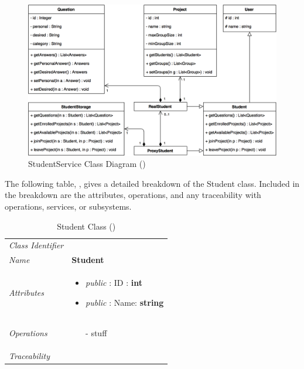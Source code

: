 \documentclass[12pt,letterpaper]{article}
\begin{document}
\begin{figure}[H]
	\centering{}
	\includegraphics[scale=0.33]{imgs/d3/interfaces/student.png}
	\caption{StudentService Class Diagram ()}
\end{figure}

The following table, , gives a detailed breakdown of the Student class. Included in the breakdown are the attributes, operations, and any traceability with operations, services, or subsystems.

\begin{table}[H]
    \caption{Student Class ()} 
	\begin{tabu} to 
		\toprule
		Class Identifier &  \\
		Name & {\bf Student} \\
		Attributes & 
		\begin{minipage}[t]{\linewidth}
		    \begin{itemize}
		        \item \textit{public} : ID : {\bf int}
		        \item \textit{public} : Name: {\bf string}
			\end{itemize}
	    \end{minipage} \\

		Operations &
		\begin{minipage}[t]{\linewidth}
			\begin{enumerate}
			    \item[-] stuff
	        \end{enumerate}
	    \end{minipage} \\
	    	Traceability & \\
		\toprule
	\end{tabu}
\end{table}
\end{document}
